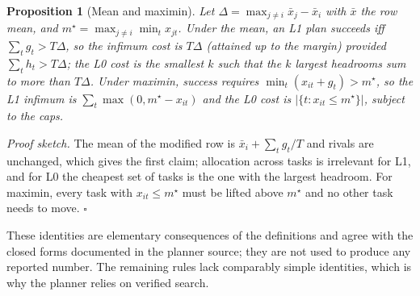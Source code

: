 \documentclass{article}
\newtheorem{proposition}{Proposition}
\begin{document}
\begin{proposition}[Mean and maximin]
Let $\Delta=\max_{j\ne i}\bar x_j-\bar x_i$ with $\bar x$ the row mean, and $m^\star=\max_{j\neq i}\min_t x_{jt}$. Under the mean, an L1 plan succeeds iff $\sum_t g_t>T\Delta$, so the infimum cost is $T\Delta$ (attained up to the margin) provided $\sum_t h_t>T\Delta$; the L0 cost is the smallest $k$ such that the $k$ largest headrooms sum to more than $T\Delta$. Under maximin, success requires $\min_t(x_{it}+g_t)>m^\star$, so the L1 infimum is $\sum_t\max(0,m^\star-x_{it})$ and the L0 cost is $|\{t:x_{it}\le m^\star\}|$, subject to the caps.
\end{proposition}
\emph{Proof sketch.} The mean of the modified row is $\bar x_i+\sum_t g_t/T$ and rivals are unchanged, which gives the first claim; allocation across tasks is irrelevant for L1, and for L0 the cheapest set of tasks is the one with the largest headroom. For maximin, every task with $x_{it}\le m^\star$ must be lifted above $m^\star$ and no other task needs to move. \hfill$\square$

These identities are elementary consequences of the definitions and agree with the closed forms documented in the planner source; they are not used to produce any reported number. The remaining rules lack comparably simple identities, which is why the planner relies on verified search.
\end{document}
